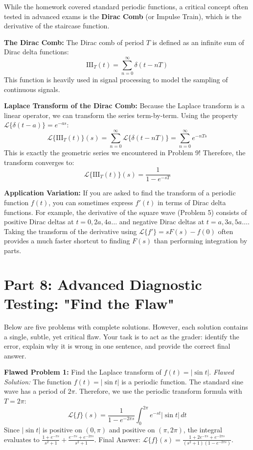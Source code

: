 \documentclass[11pt, letterpaper]{article}
\theoremstyle{definition}
\theoremstyle{remark}
\begin{document}
While the homework covered standard periodic functions, a critical concept often tested in advanced exams is the \textbf{Dirac Comb} (or Impulse Train), which is the derivative of the staircase function.

\textbf{The Dirac Comb:}
The Dirac comb of period $T$ is defined as an infinite sum of Dirac delta functions:
\[ \text{III}_T(t) = \sum_{n=0}^\infty \delta(t - nT) \]
This function is heavily used in signal processing to model the sampling of continuous signals.

\textbf{Laplace Transform of the Dirac Comb:}
Because the Laplace transform is a linear operator, we can transform the series term-by-term. Using the property $\mathcal{L}\{\delta(t-a)\} = e^{-as}$:
\[ \mathcal{L}\{\text{III}_T(t)\}(s) = \sum_{n=0}^\infty \mathcal{L}\{\delta(t - nT)\} = \sum_{n=0}^\infty e^{-nTs} \]
This is exactly the geometric series we encountered in Problem 9! Therefore, the transform converges to:
\[ \mathcal{L}\{\text{III}_T(t)\}(s) = \frac{1}{1 - e^{-sT}} \]

\textbf{Application Variation:}
If you are asked to find the transform of a periodic function $f(t)$, you can sometimes express $f'(t)$ in terms of Dirac delta functions. 
For example, the derivative of the square wave (Problem 5) consists of positive Dirac deltas at $t=0, 2a, 4a \dots$ and negative Dirac deltas at $t=a, 3a, 5a \dots$. 
Taking the transform of the derivative using $\mathcal{L}\{f'\} = sF(s) - f(0)$ often provides a much faster shortcut to finding $F(s)$ than performing integration by parts.

\newpage
\section{Part 8: Advanced Diagnostic Testing: "Find the Flaw"}

Below are five problems with complete solutions. However, each solution contains a single, subtle, yet critical flaw. Your task is to act as the grader: identify the error, explain why it is wrong in one sentence, and provide the correct final answer.

\vspace{1em}
\textbf{Flawed Problem 1:} Find the Laplace transform of $f(t) = |\sin t|$.
\textit{Flawed Solution:} The function $f(t) = |\sin t|$ is a periodic function. The standard sine wave has a period of $2\pi$. Therefore, we use the periodic transform formula with $T = 2\pi$:
\[ \mathcal{L}\{f\}(s) = \frac{1}{1 - e^{-2\pi s}} \int_0^{2\pi} e^{-st} |\sin t| \, dt \]
Since $|\sin t|$ is positive on $(0, \pi)$ and positive on $(\pi, 2\pi)$, the integral evaluates to $\frac{1 + e^{-\pi s}}{s^2+1} + \frac{e^{-\pi s} + e^{-2\pi s}}{s^2+1}$.
Final Answer: $\mathcal{L}\{f\}(s) = \frac{1 + 2e^{-\pi s} + e^{-2\pi s}}{(s^2+1)(1 - e^{-2\pi s})}$.
\end{document}
